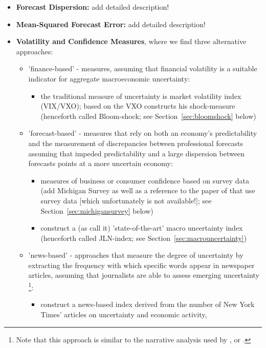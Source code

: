 \documentclass[a4paper,12pt,oneside,pointednumbers,bibtotoc,bigheadings,liststotoc]{scrbook}
\begin{document}
\begin{itemize}
	\item \textbf{Forecast Dispersion:} add detailed description!
	\item \textbf{Mean-Squared Forecast Error:} add detailed description!
	\item \textbf{Volatility and Confidence Measures}, where we find three alternative approaches:
		\begin{itemize}
			\item 'finance-based' - measures, assuming that financial volatility is a suitable indicator for aggregate macroeconomic uncertainty: 
			\begin{itemize}
				\item the traditional measure of uncertainty is market volatility index (VIX/VXO); based on the VXO \citet{bloom:09} constructs his shock-measure (henceforth called Bloom-shock; see Section~\ref{sec:bloomshock} below)
			\end{itemize}
			\item 'forecast-based' - measures that rely on both an economy's predictability and the measurement of discrepancies between professional forecasts assuming that impeded predictability and a large dispersion between forecasts points at a more uncertain economy:
			\begin{itemize}
				\item measures of business or consumer confidence based on survey data (add Michigan Survey as well as a reference to the paper of \citet{bachmannetal:13} that use survey data [which unfortunately is not available!]; see Section~\ref{sec:michigansurvey} below)
				\item \citet{juradoetal:15} construct a (as \citet{orlikandveldkamp:14} call it) 'state-of-the-art' macro uncertainty index (henceforth called JLN-index; see Section~\ref{sec:macrouncertainty})
			\end{itemize}
			\item 'news-based' - approaches that measure the degree of uncertainty by extracting the frequency with which specific words appear in newspaper articles, assuming that journalists are able to assess emerging uncertainty \footnote{Note that this approach is similar to the narrative analysis used by \citet{romerandromer:04}, \citet{romandrom:17} or \citet{ramey:09}.}: 
			\begin{itemize}
				\item \citet{alexopoulosandcohen:09} construct a news-based index derived from the number of New York Times' articles on uncertainty and economic activity,

\end{itemize}
\end{itemize}
\end{itemize}
\end{document}
